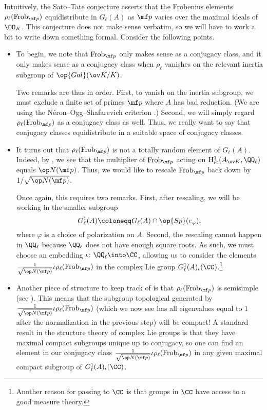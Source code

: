 \documentclass[../thesis.tex]{subfiles}
\begin{document}
Intuitively, the Sato--Tate conjecture asserts that the Frobenius elements $\rho_\ell(\mathrm{Frob}_{\mf p})$ equidistribute in $G_\ell(A)$ as $\mf p$ varies over the maximal ideals of $\OO_K$. This conjecture does not make sense verbatim, so we will have to work a bit to write down something formal. Consider the following points.
\begin{itemize}
	\item To begin, we note that $\mathrm{Frob}_{\mf p}$ only makes sense as a conjugacy class, and it only makes sense as a conjugacy class when $\rho_\ell$ vanishes on the relevant inertia subgroup of $\op{Gal}(\ov K/K)$.
	
	Two remarks are thus in order. First, to vanish on the inertia subgroup, we must exclude a finite set of primes $\mf p$ where $A$ has bad reduction. (We are using the N\'eron--Ogg--Shafarevich criterion \cite[Theorem~5]{bosch-neron-models}.) Second, we will simply regard $\rho_\ell(\mathrm{Frob}_{\mf p})$ as a conjugacy class as well. Thus, we really want to say that conjugacy classes equidistribute in a suitable space of conjugacy classes.

	\item It turns out that $\rho_\ell(\mathrm{Frob}_{\mf p})$ is not a totally random element of $G_\ell(A)$. Indeed, by , we see that the multiplier of $\mathrm{Frob}_{\mf p}$ acting on $\mathrm H^1_{\mathrm{\acute et}}(A_{\ov K},\QQ_\ell)$ equals $\op N(\mf p)$. Thus, we would like to rescale $\mathrm{Frob}_{\mf p}$ back down by $1/\sqrt{\op N(\mf p)}$.
	
	Once again, this requires two remarks. First, after rescaling, we will be working in the smaller subgroup
	\[G_\ell^1(A)\coloneqq G_\ell(A)\cap\op{Sp}(e_\varphi),\]
	where $\varphi$ is a choice of polarization on $A$. Second, the rescaling cannot happen in $\QQ_\ell$ because $\QQ_\ell$ does not have enough square roots. As such, we must choose an embedding $\iota\colon\QQ_\ell\into\CC$, allowing us to consider the elements $\frac1{\sqrt{\op N(\mf p)}}\iota\rho_\ell(\mathrm{Frob}_{\mf p})$ in the complex Lie group $G_\ell^1(A)_\iota(\CC)$.\footnote{Another reason for passing to $\CC$ is that groups in $\CC$ have access to a good measure theory.}

	\item Another piece of structure to keep track of is that $\rho_\ell(\mathrm{Frob}_{\mf p})$ is semisimple (see ). This means that the subgroup topological generated by $\frac1{\sqrt{\op N(\mf p)}}\iota\rho_\ell(\mathrm{Frob}_{\mf p})$ (which we now see has all eigenvalues equal to $1$ after the normalization in the previous step) will be compact! A standard result in the structure theory of complex Lie groups is that they have maximal compact subgroups unique up to conjugacy, so one can find an element in our conjugacy class $\frac1{\sqrt{\op N(\mf p)}}\iota\rho_\ell(\mathrm{Frob}_{\mf p})$ in any given maximal compact subgroup of $G_\ell^1(A)_\iota(\CC)$.
\end{itemize}
\end{document}

